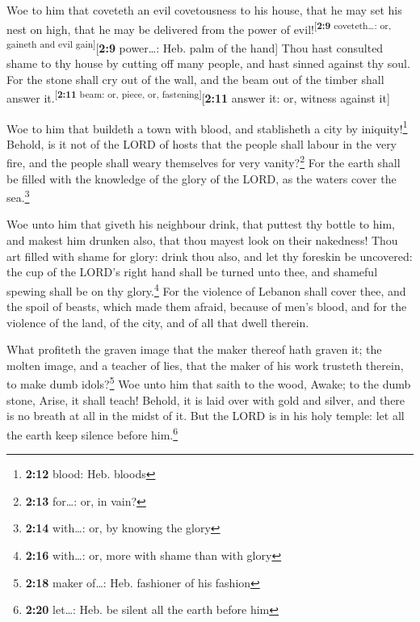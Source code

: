  Woe to him that coveteth an evil covetousness to his
house, that he may set his nest on high, that he may be delivered from
the power of evil!\textsuperscript{{[}\textbf{2:9} coveteth\ldots: or,
gaineth and evil gain{]}}{[}\textbf{2:9} power\ldots: Heb. palm of the
hand{]}  Thou hast consulted shame to thy house by
cutting off many people, and hast sinned against thy soul.
 For the stone shall cry out of the wall, and the beam
out of the timber shall answer it.\textsuperscript{{[}\textbf{2:11}
beam: or, piece, or, fastening{]}}{[}\textbf{2:11} answer it: or,
witness against it{]}

 Woe to him that buildeth a town with blood, and
stablisheth a city by iniquity!\footnote{\textbf{2:12} blood: Heb.
  bloods}  Behold, is it not of the LORD of hosts that
the people shall labour in the very fire, and the people shall weary
themselves for very vanity?\footnote{\textbf{2:13} for\ldots: or, in
  vain?}  For the earth shall be filled with the
knowledge of the glory of the LORD, as the waters cover the
sea.\footnote{\textbf{2:14} with\ldots: or, by knowing the glory}

 Woe unto him that giveth his neighbour drink, that
puttest thy bottle to him, and makest him drunken also, that thou mayest
look on their nakedness!  Thou art filled with shame for
glory: drink thou also, and let thy foreskin be uncovered: the cup of
the LORD's right hand shall be turned unto thee, and shameful spewing
shall be on thy glory.\footnote{\textbf{2:16} with\ldots: or, more with
  shame than with glory}  For the violence of Lebanon
shall cover thee, and the spoil of beasts, which made them afraid,
because of men's blood, and for the violence of the land, of the city,
and of all that dwell therein.

 What profiteth the graven image that the maker thereof
hath graven it; the molten image, and a teacher of lies, that the maker
of his work trusteth therein, to make dumb idols?\footnote{\textbf{2:18}
  maker of\ldots: Heb. fashioner of his fashion}  Woe
unto him that saith to the wood, Awake; to the dumb stone, Arise, it
shall teach! Behold, it is laid over with gold and silver, and there is
no breath at all in the midst of it.  But the LORD is in
his holy temple: let all the earth keep silence before him.\footnote{\textbf{2:20}
  let\ldots: Heb. be silent all the earth before him}

